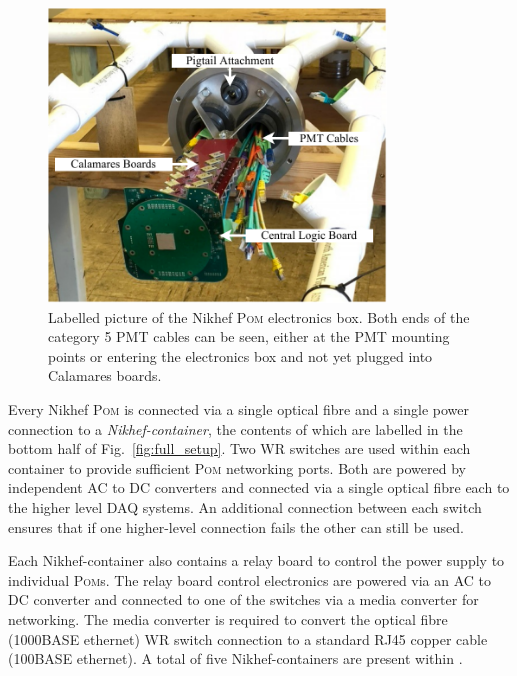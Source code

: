 \begin{figure} %
    \includegraphics[width=0.8\textwidth]{diagrams/5-daq/nikhef_plane.pdf}
    \caption[Labelled picture of the Nikhef \textsc{Pom} electronics box.]
    {Labelled picture of the Nikhef \textsc{Pom} electronics box. Both ends of the category 5 PMT cables
        can be seen, either at the PMT mounting points or entering the electronics box and not yet
        plugged into Calamares boards.}
    \label{fig:nikhef_plane}
\end{figure}

Every Nikhef \textsc{Pom} is connected via a single optical fibre and a single power connection to a
\emph{Nikhef-container}, the contents of which are labelled in the bottom half of
Fig.~\ref{fig:full_setup}. Two WR switches are used within each container to provide sufficient
\textsc{Pom} networking ports. Both are powered by independent AC to DC converters and connected via a
single optical fibre each to the higher level DAQ systems. An additional connection between each
switch ensures that if one higher-level connection fails the other can still be used.

Each Nikhef-container also contains a relay board to control the power supply to individual \textsc{Pom}s.
The relay board control electronics are powered via an AC to DC converter and connected to one of
the switches via a media converter for networking. The media converter is required to convert the
optical fibre (1000BASE ethernet) WR switch connection to a standard RJ45 copper cable (100BASE
ethernet). A total of five Nikhef-containers are present within \chipsfive.

